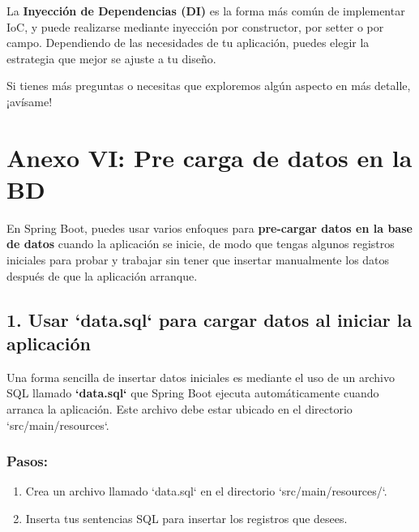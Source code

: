 \documentclass[11pt]{article}
\begin{document}
La \textbf{\textbf{Inyección de Dependencias (DI)}} es la forma más común de implementar IoC, y puede realizarse mediante inyección por constructor, por setter o por campo. Dependiendo de las necesidades de tu aplicación, puedes elegir la estrategia que mejor se ajuste a tu diseño.

Si tienes más preguntas o necesitas que exploremos algún aspecto en más detalle, ¡avísame!


\section{Anexo VI: Pre carga de datos en la BD}
\label{sec:org25a25f7}

En Spring Boot, puedes usar varios enfoques para \textbf{\textbf{pre-cargar datos en la base de datos}} cuando la aplicación se inicie, de modo que tengas algunos registros iniciales para probar y trabajar sin tener que insertar manualmente los datos después de que la aplicación arranque.

\subsection{1. Usar `data.sql` para cargar datos al iniciar la aplicación}
\label{sec:org83152fd}
Una forma sencilla de insertar datos iniciales es mediante el uso de un archivo SQL llamado \textbf{\textbf{`data.sql`}} que Spring Boot ejecuta automáticamente cuando arranca la aplicación. Este archivo debe estar ubicado en el directorio `src/main/resources`.

\subsubsection{Pasos:}
\label{sec:orgb336598}
\begin{enumerate}
\item Crea un archivo llamado `data.sql` en el directorio `src/main/resources/`.
\item Inserta tus sentencias SQL para insertar los registros que desees.
\end{enumerate}
\end{document}
